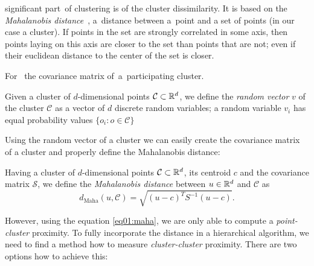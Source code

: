  significant part\ of  clustering  is  of the cluster dissimilarity. It is based on the \emph{Mahalanobis distance}~\cite{mahalanobis1936generalized}, a~distance between a~point and a set of points (in our case a cluster). If points in the set are strongly correlated in some axis, then points laying on this axis are closer to the set than points that are not; even if their euclidean distance to the center of the set is closer.

For \ the covariance matrix of~a~participating cluster. 

\begin{defn}
	Given a cluster of $d$-dimensional points $\mathcal{C} \subset \mathbb{R}^d$, we define the \emph{random vector} $v$ of the cluster $\mathcal{C}$ as a vector of $d$ discrete random variables; a random variable $v_i$ has equal probability values $\{o_i:o\in \mathcal{C}\}$
\end{defn}

Using the random vector of a cluster we can easily create the covariance matrix of a cluster and properly define the Mahalanobis distance:

\begin{defn} 
	\label{eq01:maha}
	Having a cluster of $d$-dimensional points $\mathcal{C} \subset \mathbb{R}^d$, its centroid $c$ and the covariance matrix $\mathcal{S}$, we define the \emph{Mahalanobis distance} between $u \in \mathbb{R}^d$ and $\mathcal{C}$ as
	\[d_\text{Maha}(u,\mathcal{C}) = \sqrt{(u-c)^TS^{-1}(u-c)}.\]
\end{defn}


However, using the equation \ref{eq01:maha}, we are only able to compute a \emph{point-cluster} proximity. To fully incorporate the distance in a hierarchical algorithm, we need to find a method how to measure \emph{cluster-cluster} proximity. There are two options how to achieve this:

